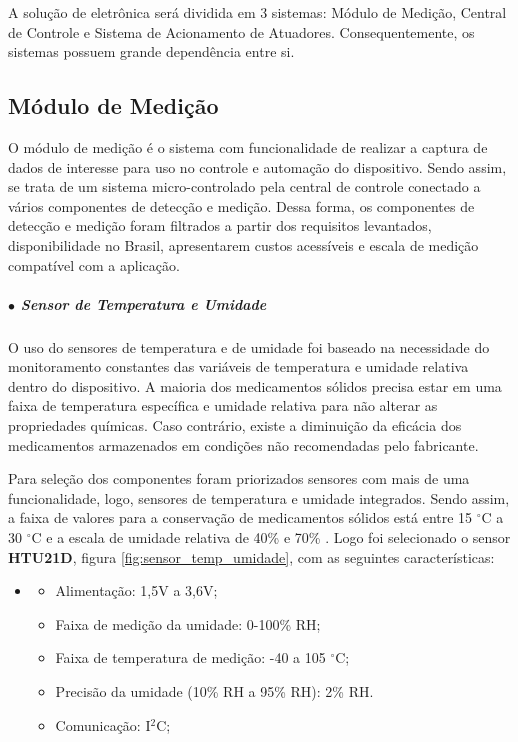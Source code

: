 A solução de eletrônica será dividida em 3 sistemas: Módulo de Medição, Central de Controle e Sistema de Acionamento de Atuadores. Consequentemente, os sistemas possuem grande dependência entre si.

\subsection{Módulo de Medição}

O módulo de medição é o sistema com funcionalidade de realizar a captura de dados de interesse para uso no controle e automação do dispositivo. Sendo assim, se trata de um sistema micro-controlado pela central de controle conectado a vários componentes de detecção e medição. Dessa forma, os componentes de detecção e medição foram filtrados a partir dos requisitos levantados, disponibilidade no Brasil, apresentarem custos acessíveis e escala de medição compatível com a aplicação.



    \subparagraph*{$\bullet$ Sensor de Temperatura e Umidade} \hfill
    
    O uso do sensores de temperatura e de umidade foi baseado na necessidade do monitoramento constantes das variáveis de temperatura e umidade relativa dentro do dispositivo. A maioria dos medicamentos sólidos precisa estar em uma faixa de temperatura específica e umidade relativa para não alterar as propriedades químicas. Caso contrário, existe a diminuição da eficácia dos medicamentos armazenados em condições não recomendadas pelo fabricante. 
    
    Para seleção dos componentes foram priorizados sensores com mais de uma funcionalidade, logo, sensores de temperatura e umidade integrados. Sendo assim, a faixa de valores para a conservação de medicamentos sólidos está entre 15 $^\circ$C a 30 $^\circ$C e a escala de umidade relativa de 40\% e 70\% \cite{Pinto_2016}. Logo foi selecionado o sensor \textbf{HTU21D}, figura \ref{fig:sensor_temp_umidade}, com as seguintes características:

    \begin{itemize}
    \item[ ]
        \begin{itemize}
            \item Alimentação: 1,5V a 3,6V;
            \item Faixa de medição da umidade: 0-100\% RH;
            \item Faixa de temperatura de medição: -40 a 105 $^\circ$C;
            \item Precisão da umidade (10\% RH a 95\% RH):  2\% RH.
            \item Comunicação: I$^2$C;
        \end{itemize}
    \end{itemize}


